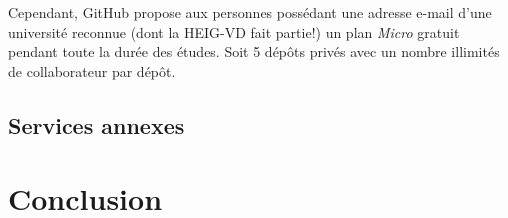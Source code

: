 \documentclass[11pt,a4paper]{article}
\begin{document}
Cependant, GitHub propose aux personnes possédant une adresse e-mail d'une université reconnue (dont la HEIG-VD fait partie!) un plan \textit{Micro} gratuit pendant toute la durée des études. Soit 5 dépôts privés avec un nombre illimités de collaborateur par dépôt.

\subsection{Services annexes}

\section{Conclusion}
\end{document}
